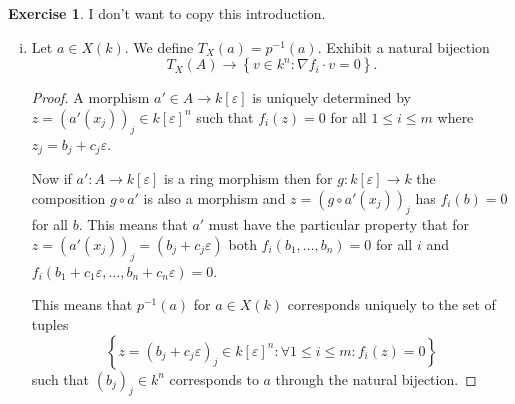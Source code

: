 \documentclass{article}
\newcommand{\setwith}[2]{\left\{#1:#2\right\}}
\theoremstyle{definition}
\newtheorem{question}{Exercise}
\begin{document}
\begin{question}
    I don't want to copy this introduction.

    \begin{enumerate}[(i)]
        \item Let \(a\in X(k)\). We define \(T_{X}(a)=p^{-1}(a)\). Exhibit a
              natural bijection
              \[
                  T_{X}(A)\to\setwith{v\in k^{n}}{\nabla f_{i}\cdot v=0}.
              \]

              \begin{proof}
                  A morphism \(a'\in A\to k[\varepsilon]\) is uniquely
                  determined by \(z=(a'(x_{j}))_{j}\in k[\varepsilon]^{n}\) such
                  that \(f_{i}(z)=0\) for all \(1\leq i\leq m\) where
                  \(z_{j}=b_{j}+c_{j}\varepsilon\).

                  Now if \(a':A\to k[\varepsilon]\) is a ring morphism then for
                  \(g:k[\varepsilon]\to k\) the composition \(g\circ a'\) is
                  also a morphism and \(z=(g\circ a'(x_{j}))_{j}\) has
                  \(f_{i}(b)=0\) for all \(b\). This means that \(a'\) must have
                  the particular property that for
                  \(z=(a'(x_{j}))_{j}=(b_{j}+c_{j}\varepsilon)\) both
                  \(f_{i}(b_{1},\ldots,b_{n})=0\) for all \(i\) and
                  \(f_{i}(b_{1}+c_{1}\varepsilon,\ldots,b_{n}+c_{n}\varepsilon)=0\).

                  This means that \(p^{-1}(a)\) for \(a\in X(k)\) corresponds
                  uniquely to the set of tuples
                  \[
                      \setwith{z=(b_{j}+c_{j}\varepsilon)_{j}\in k[\varepsilon]^{n}}{\forall 1\leq i\leq m:f_{i}(z)=0}
                  \]
                  such that \((b_{j})_{j}\in k^{n}\) corresponds to \(a\)
                  through the natural bijection.


\end{proof}
\end{enumerate}
\end{question}
\end{document}
